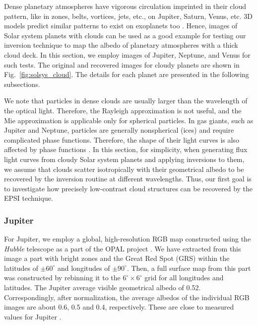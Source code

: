 \documentclass{emulateapj}
\begin{document}
Dense planetary atmospheres have vigorous circulation imprinted in their cloud pattern,
like in zones, belts, vortices, jets, etc., on Jupiter, Saturn, Venus, etc. 
3D models predict similar patterns to exist on exoplanets too
\citep[e.g.,][]{heng2015,amu2016,kom2016}. Hence, images of Solar system planets 
with clouds can be used as a good example for testing our inversion technique 
to map the albedo of planetary atmospheres with a thick cloud deck. 
In this section, we employ images of Jupiter, Neptune, and Venus for such tests. 
The original and recovered images for cloudy planets
are shown in Fig.~\ref{fig:solsys_cloud}. The details for each planet are presented
in the following subsections.

We note that particles in dense clouds are usually larger than the wavelength
of the optical light. Therefore, the Rayleigh approximation is not useful,
and the Mie approximation is applicable only for spherical particles.
In gas giants, such as Jupiter and Neptune, particles are generally
nonspherical (ices) and require complicated phase functions. 
Therefore, the shape of their light curves is also affected by phase functions 
\citep[e.g.,][]{dyu16}.
In this section, for simplicity, when generating flux light curves 
from cloudy Solar system planets and applying inversions to them, 
we assume that clouds scatter isotropically with their geometrical 
albedo to be recovered by the inversion routine at different wavelengths.
Thus, our first goal is to investigate how precisely low-contrast cloud structures
can be recovered by the EPSI technique.

\subsubsection{Jupiter}\label{sec:inve_solsys_clouds_jup}

For Jupiter, we employ a global, high-resolution RGB map constructed using the {\em Hubble}
telescope as a part of the OPAL project \citep{jup_hub}. 
We have extracted from this image a part with bright zones and the Great Red Spot (GRS) 
within the latitudes of $\pm60^\circ$ and longitudes of $\pm90^\circ$.
Then, a full surface map from this part was constructed
by rebinning it to the $6^\circ\times6^\circ$ grid for all longitudes and latitudes.
The Jupiter average visible geometrical albedo of 0.52. Correspondingly, after 
normalization, the average albedos of the individual RGB images are about 0.6, 0.5 and 0.4, 
respectively. These are close to measured values for Jupiter \citep{kar1994}.  
\end{document}
